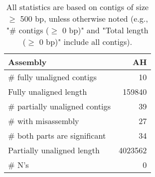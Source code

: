 \documentclass[12pt,a4paper]{article}
\begin{document}
\begin{table}[ht]
\begin{center}
\caption{All statistics are based on contigs of size $\geq$ 500 bp, unless otherwise noted (e.g., "\# contigs ($\geq$ 0 bp)" and "Total length ($\geq$ 0 bp)" include all contigs).}
\begin{tabular}{|l*{1}{|r}|}
\hline
Assembly & AH \\ \hline
\# fully unaligned contigs & 10 \\ \hline
Fully unaligned length & 159840 \\ \hline
\# partially unaligned contigs & 39 \\ \hline
\hspace{5mm}\# with misassembly & 27 \\ \hline
\hspace{5mm}\# both parts are significant & 34 \\ \hline
Partially unaligned length & 4023562 \\ \hline
\# N's & 0 \\ \hline
\end{tabular}
\end{center}
\end{table}
\end{document}
